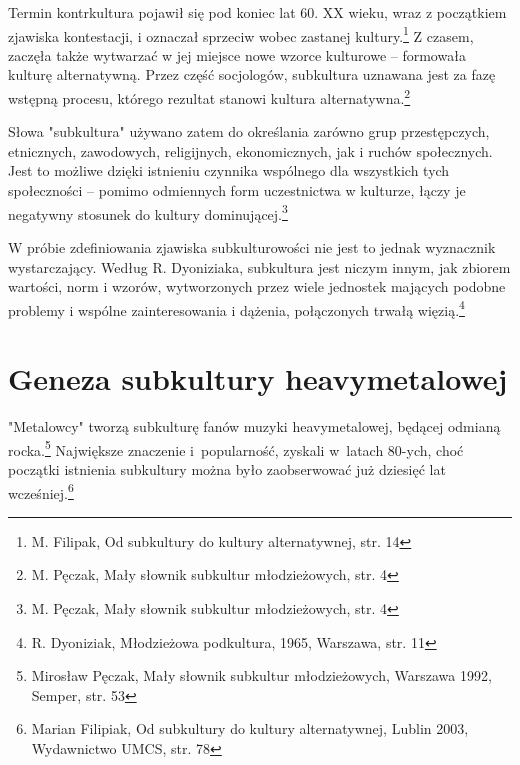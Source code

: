 \documentclass[12pt, a4paper, titlepage]{report}
\begin{document}
Termin kontrkultura pojawił się pod koniec lat 60. XX wieku, wraz z początkiem zjawiska kontestacji, i oznaczał sprzeciw wobec zastanej kultury.\footnote{M. Filipak, Od subkultury do kultury alternatywnej, str. 14} Z czasem, zaczęła także wytwarzać w jej miejsce nowe wzorce kulturowe -- formowała kulturę alternatywną. Przez część socjologów, subkultura uznawana jest za fazę wstępną procesu, którego rezultat stanowi kultura alternatywna.\footnote{M. Pęczak, Mały słownik subkultur młodzieżowych, str. 4}

Słowa "subkultura" używano zatem do określania zarówno grup przestępczych, etnicznych, zawodowych, religijnych, ekonomicznych, jak i ruchów społecznych. Jest to możliwe dzięki istnieniu czynnika wspólnego dla wszystkich tych społeczności -- pomimo odmiennych form uczestnictwa w kulturze, łączy je negatywny stosunek do kultury dominującej.\footnote{M. Pęczak, Mały słownik subkultur młodzieżowych, str. 4}

W próbie zdefiniowania zjawiska subkulturowości nie jest to jednak wyznacznik wystarczający. Według R. Dyoniziaka, subkultura jest niczym innym, jak zbiorem wartości, norm i wzorów, wytworzonych przez wiele jednostek mających podobne problemy i wspólne zainteresowania i dążenia, połączonych trwałą więzią.\footnote{R. Dyoniziak, Młodzieżowa podkultura, 1965, Warszawa, str. 11}






\section{Geneza subkultury heavymetalowej}
"Metalowcy" tworzą subkulturę fanów muzyki heavymetalowej, będącej odmianą rocka.\footnote{Mirosław Pęczak, Mały słownik subkultur młodzieżowych, Warszawa 1992, Semper, str. 53}  Największe znaczenie i~popularność, zyskali w~latach 80-ych, choć początki istnienia subkultury można było zaobserwować już dziesięć lat wcześniej.\footnote{Marian Filipiak, Od subkultury do kultury alternatywnej, Lublin 2003, Wydawnictwo UMCS, str. 78} 
\end{document}
